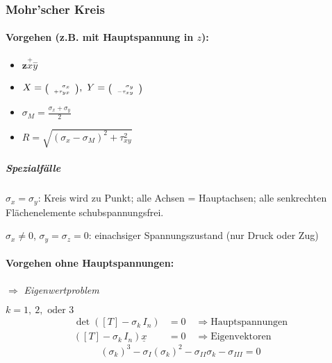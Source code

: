 \documentclass{article}
\begin{document}
\begin{multicols*}{4}
				\subsubsection{Mohr'scher Kreis} %
					\paragraph{Vorgehen (z.B. mit Hauptspannung in $z$):} %
						\begin{itemize}
							\item[] $\mathbf{z}\overset{\mathbf{+}}{x} \overset{\mathbf{-}}{y}$
							\item[] $
								X=\mbox{\tiny $\left(\begin{array}{r}
									\sigma_x \\
									\mathbf{+} \tau_{yx}
								\end{array}\right)$}
								,\
								Y=\mbox{\tiny $\left(\begin{array}{r}
									\sigma_y \\
									\mathbf{-} \tau_{xy}
								\end{array}\right)$}
							$
							\item[] $\sigma_M = \frac{\sigma_x + \sigma_y}{2}$
							\item[] $R = \sqrt{(\sigma_x - \sigma_M)^2 + \tau_{xy}^2}$
						\end{itemize}
						\subparagraph{Spezialfälle} %
							$\sigma_x = \sigma_y$: Kreis wird zu Punkt; alle
							Achsen = Hauptachsen; alle senkrechten Flächenelemente
							schubspannungsfrei.
							
							$\sigma_x \neq 0$, $\sigma_y = \sigma_z = 0$: einachsiger Spannungszustand (nur Druck oder Zug)
					\paragraph{Vorgehen ohne Hauptspannungen:} %
						$\Rightarrow$ \emph{Eigenwertproblem}
						
						$k = 1,\ 2, \text{ oder } 3$ 
						\begin{align*}
							\det([T]- \sigma_k \, I_n) &= 0 \quad \Rightarrow \text{Hauptspannungen} \\
							([T]- \sigma_k \, I_n) \underline{x} &= 0 \quad \Rightarrow \text{Eigenvektoren}
						\end{align*}
						\[
							(\sigma_k)^3 - \sigma_I (\sigma_k)^2 - \sigma_{II} \sigma_k - \sigma_{III} = 0
						\]

\end{multicols*}
\end{document}
